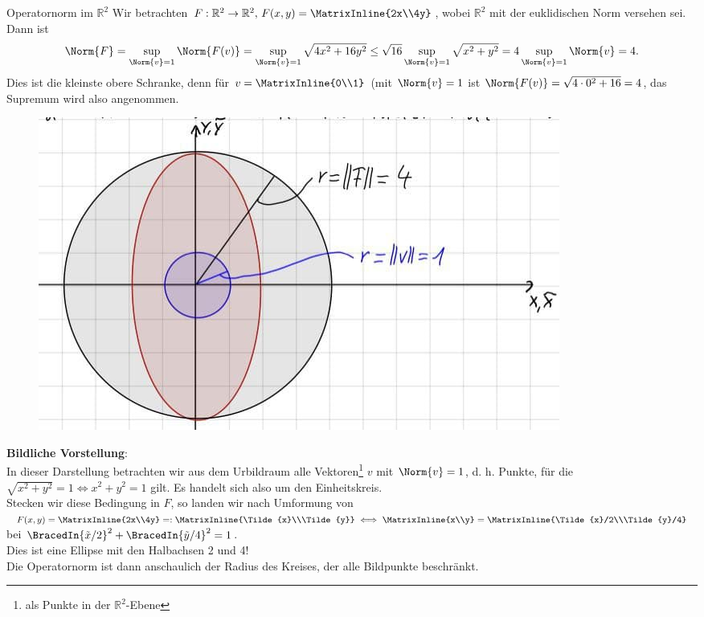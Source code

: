 \begin{Beispiel}{Operatornorm im $\mathbb{R}^2$}
Wir betrachten $F:\mathbb{R}^2\to\mathbb{R}^2,\,F(x,y)=\MatrixInline{2x\\4y}$, wobei $\mathbb{R}^2$ mit der euklidischen Norm versehen sei.\\
Dann ist
\begin{equation*}
    \Norm{F}=\sup_{\Norm{v}=1}\Norm{F(v)}=\sup_{\Norm{v}=1}\sqrt{4x^2+16y^2}\leq\sqrt{16}\sup_{\Norm{v}=1}\sqrt{x^2+y^2}=4\sup_{\Norm{v}=1}\Norm{v}=4.
\end{equation*}
Dies ist die kleinste obere Schranke, denn für $v=\MatrixInline{0\\1}$ (mit $\Norm{v}=1$ ist $\Norm{F(v)}=\sqrt{4\cdot0^2+16}=4$, das Supremum wird also angenommen.\\
\begin{figure}
 \vspace{-15pt}
\includegraphics[width=.35\textwidth]{Dateien/06/06OperatornormBeispiel.jpg}
 \vspace{-15pt}
\end{figure}
\textbf{Bildliche Vorstellung}:\\
In dieser Darstellung betrachten wir aus dem Urbildraum alle Vektoren\footnote{als Punkte in der $\mathbb{R}^2$-Ebene} $v$ mit $\Norm{v}=1$, d. h. Punkte, für die $\sqrt{x^2+y^2}=1\iff x^2+y^2=1$ gilt. Es handelt sich also um den Einheitskreis.\\
Stecken wir diese Bedingung in $F$, so landen wir nach Umformung von $F(x,y)=\MatrixInline{2x\\4y}=:\MatrixInline{\Tilde{x}\\\Tilde{y}}\iff\MatrixInline{x\\y}=\MatrixInline{\Tilde{x}/2\\\Tilde{y}/4}$ bei $\BracedIn{\Tilde{x}/2}^2+\BracedIn{\Tilde{y}/4}^2=1$.\\
Dies ist eine Ellipse mit den Halbachsen 2 und 4!\\
Die Operatornorm ist dann anschaulich der Radius des Kreises, der alle Bildpunkte beschränkt.
\end{Beispiel}
